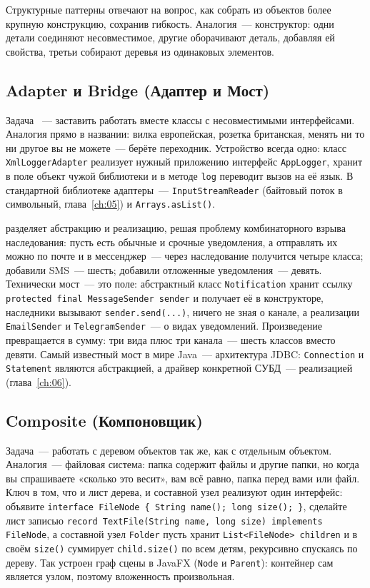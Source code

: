 Структурные паттерны отвечают на вопрос, как собрать из объектов более крупную
конструкцию, сохранив гибкость. Аналогия~--- конструктор: одни детали соединяют
несовместимое, другие оборачивают деталь, добавляя ей свойства, третьи собирают
деревья из одинаковых элементов.

\subsection{Adapter и Bridge (Адаптер и Мост)}

Задача ~--- заставить работать вместе классы с несовместимыми
интерфейсами. Аналогия прямо в названии: вилка европейская, розетка британская,
менять ни то ни другое вы не можете~--- берёте переходник. Устройство всегда
одно: класс \texttt{XmlLoggerAdapter} реализует нужный приложению интерфейс
\texttt{AppLogger}, хранит в поле объект чужой библиотеки и в методе \texttt{log}
переводит вызов на её язык. В стандартной библиотеке адаптеры~---
\texttt{InputStreamReader} (байтовый поток в символьный, глава~\ref{ch:05}) и
\texttt{Arrays.asList()}.

 разделяет абстракцию и реализацию, решая проблему комбинаторного
взрыва наследования: пусть есть обычные и срочные уведомления, а отправлять их
можно по почте и в мессенджер~--- через наследование получится четыре класса;
добавили SMS~--- шесть; добавили отложенные уведомления~--- девять. Технически
мост~--- это поле: абстрактный класс \texttt{Notification} хранит ссылку
\texttt{protected final MessageSender sender} и получает её в конструкторе,
наследники вызывают \texttt{sender.send(...)}, ничего не зная о канале, а
реализации \texttt{EmailSender} и \texttt{TelegramSender}~--- о видах
уведомлений. Произведение превращается в сумму: три вида плюс три канала~---
шесть классов вместо девяти. Самый известный мост в мире Java~--- архитектура
JDBC: \texttt{Connection} и \texttt{Statement} являются абстракцией, а драйвер
конкретной СУБД~--- реализацией (глава~\ref{ch:06}).

\subsection{Composite (Компоновщик)}

Задача~--- работать с деревом объектов так же, как с отдельным объектом.
Аналогия~--- файловая система: папка содержит файлы и другие папки, но когда вы
спрашиваете «сколько это весит», вам всё равно, папка перед вами или файл. Ключ
в том, что и лист дерева, и составной узел реализуют один интерфейс: объявите
\texttt{interface FileNode \{ String name(); long size(); \}}, сделайте лист
записью \texttt{record TextFile(String name, long size) implements FileNode}, а
составной узел \texttt{Folder} пусть хранит \texttt{List<FileNode> children} и в
своём \texttt{size()} суммирует \texttt{child.size()} по всем детям, рекурсивно
спускаясь по дереву. Так устроен граф сцены в JavaFX (\texttt{Node} и
\texttt{Parent}): контейнер сам является узлом, поэтому вложенность
произвольная.

